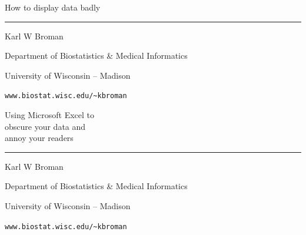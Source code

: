 \documentclass[12pt]{article}
\newcommand{\titlesize}{\fontsize{40}{50} \selectfont}
\newcommand{\headsize}{\fontsize{35}{35} \selectfont}
\newcommand{\textsize}{\fontsize{30}{35} \selectfont}
\newcommand{\smallersize}{\fontsize{20}{25} \selectfont}
\begin{document}
\thispagestyle{empty}

\begin{center}
\titlesize \color{myyellow}

\vspace*{19.5mm}

{\headsize How to display data badly}

\vspace*{19.5mm}

\color{mypink}
\rule{10in}{1mm}

\vspace{10mm}

\textsize \color{myblue}
Karl W Broman
\vspace{5mm}

{\smallersize Department of Biostatistics \& Medical Informatics

University of Wisconsin -- Madison
\vspace{20mm}


\verb|www.biostat.wisc.edu/~kbroman| 
}

\end{center}


\newpage

\thispagestyle{empty}

\begin{center}
\titlesize \color{myyellow}

\vspace*{10mm}

{\headsize Using Microsoft Excel to \\[12pt]
obscure your data and \\[2pt]
annoy your readers}


\color{mypink}
\rule{10in}{1mm}

\vspace{10mm}

\textsize \color{myblue}
Karl W Broman
\vspace{5mm}

{\smallersize Department of Biostatistics \& Medical Informatics

University of Wisconsin -- Madison
\vspace{20mm}


\verb|www.biostat.wisc.edu/~kbroman| 
}

\end{center}
\end{document}
